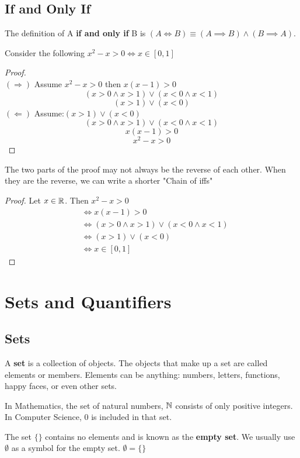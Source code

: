 \documentclass[english, 12pt]{article}
\begin{document}
\subsection{If and Only If}
\begin{defn}
The definition of A \textbf{if and only if} B is $ (A \iff B) \equiv (A \implies B)\land (B \implies A) $.
\end{defn}
\begin{exmp}
Consider the following $x^2-x > 0 \iff x \in [0,1]$
\begin{proof}\qquad\\
$(\Longrightarrow)$ Assume $x^2-x >0$ then $x(x-1) >0$\\
\[(x>0 \land x>1)\lor(x<0 \land x<1)\]
\[(x>1)\lor(x<0)\]
$(\Longleftarrow)$ Assume:$(x>1)\lor(x<0) $
\[(x>0 \land x>1)\lor(x<0 \land x<1)\]
\[x(x-1) >0\]
\[x^2-x > 0 \]

\end{proof}
\begin{note}
The two parts of the proof may not always be the reverse of each other. When they are the reverse, we can write a shorter "Chain of iffs"
\end{note}
\begin{proof}
Let $x \in {\mathbb{R}}$. Then $x^2 - x > 0$
\begin{align*}
& \iff x(x-1) > 0\\
& \iff (x>0 \land x>1)\lor(x<0 \land x<1)\\
& \iff (x>1)\lor(x<0)\\
& \iff x \in [0,1]
\end{align*}
\end{proof}
\end{exmp}
\section{Sets and Quantifiers}
\subsection{Sets}
\begin{defn}
A \textbf{set} is a collection of objects. The objects that make up a set are called elements or members. Elements can be anything: numbers, letters, functions, happy faces, or even other sets.
\end{defn}
\begin{note}
In Mathematics, the set of natural numbers, ${\mathbb{N}}$ consists of only positive integers. In Computer Science, $0$ is included in that set.
\end{note}
\begin{defn}
The set $\lbrace \rbrace$ contains no elements and is known as the \textbf{empty set}. We usually use $\emptyset$ as a symbol for the empty set. $\emptyset = \lbrace \rbrace$
\end{defn}
\end{document}
